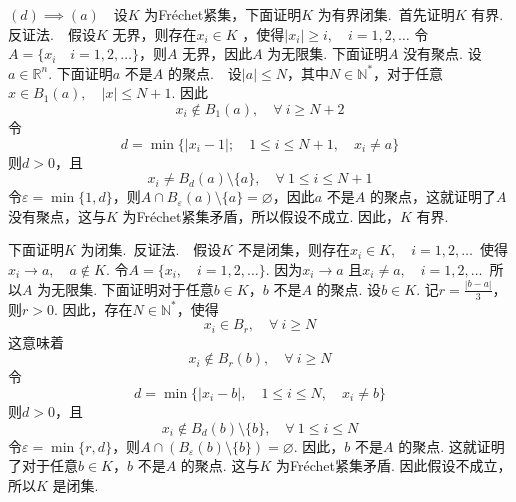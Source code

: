 \documentclass{article}
\begin{document}
\newpage

\((d) \implies (a)\)\ \ 设\(K\) 为Fréchet紧集，下面证明\(K\) 为有界闭集.\ 首先证明\(K\) 有界. 反证法.\ \ 假设\(K\) 无界，则存在\(x_i \in K\) ，使得\(| x_i | \ge i,\quad i = 1,2,\dots  \) 令\(A = \{x_i\quad i = 1,2,\dots \} \)，则\(A\) 无界，因此\(A\) 为无限集. 下面证明\(A\) 没有聚点. 设\(a \in \mathbb{R}^n\). 下面证明\(a\) 不是\(A\) 的聚点.\ \ 设\(| a | \le N \)，其中\(N \in \mathbb{N}^{*}\)，对于任意\(x \in B_1(a),\quad | x | \le N + 1 \). 因此
\begin{equation*}
    x_i \notin B_1(a),\quad \forall\ i \ge N + 2
\end{equation*}
令
\begin{equation*}
    d = \min \{| x_i - 1 |;\quad 1 \le i \le N + 1,\quad x_i \neq a \}
\end{equation*}
则\(d > 0\)，且
\begin{equation*}
    x_i \neq B_d(a)\setminus \{a\},\quad \forall\ 1 \le i \le N + 1
\end{equation*}
令\(\varepsilon = \min \{1,d\} \)，则\(A \cap B_{\varepsilon }(a)\setminus \{a\} = \varnothing  \)，因此\(a\) 不是\(A\) 的聚点，这就证明了\(A\) 没有聚点，这与\(K\) 为Fréchet紧集矛盾，所以假设不成立. 因此，\(K\) 有界.

\vspace{20pt}

下面证明\(K\) 为闭集.\ 反证法.\ \ 假设\(K\) 不是闭集，则存在\(x_i \in K,\quad i = 1,2,\dots \)\ 使得\(x_i \to a,\quad a \notin K\). 令\(A = \{x_i,\quad i = 1,2,\dots \} \). 因为\(x_i \to a\) 且\(x_i \neq a,\quad i = 1,2,\dots \)\ 所以\(A\) 为无限集. 下面证明对于任意\(b \in K\)，\(b\) 不是\(A\) 的聚点. 设\(b \in K\). 记\(r = \frac{| b - a | }{3}  \)，则\(r > 0 \). 因此，存在\(N \in \mathbb{N}^{*}\)，使得
\begin{equation*}
    x_i \in B_r, \quad \forall\ i \ge N
\end{equation*}
这意味着
\begin{equation*}
    x_i \notin B_r(b),\quad \forall\ i \ge N
\end{equation*}
令
\begin{equation*}
    d = \min \{| x_i - b |,\quad 1 \le i \le N,\quad x_i \neq b \}
\end{equation*}
则\(d > 0\)，且
\begin{equation*}
    x_i \notin B_d(b)\setminus \{b\},\quad \forall\ 1 \le i \le N
\end{equation*}
令\(\varepsilon = \min \{r,d\} \)，则\(A \cap \left( B_{\varepsilon }(b)\setminus \{b\}  \right) = \varnothing  \). 因此，\(b\) 不是\(A\) 的聚点. 这就证明了对于任意\(b \in K\)，\(b\) 不是\(A\) 的聚点. 这与\(K\) 为Fréchet紧集矛盾. 因此假设不成立，所以\(K\) 是闭集.
\end{document}
